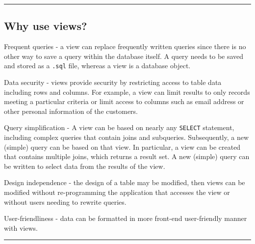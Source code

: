 \documentclass{article}
\begin{document}
\hspace{-0.5cm}\rule[-0.101in]{\textwidth}{0.0025in}
  
  




\subsection*{Why use views?}

\begin{outline}

   \1 Frequent queries - a view can replace frequently written queries since there is no other way to save a query within the database itself.  A query needs to be saved and stored as a \texttt{.sql} file, whereas a view is a database object.  
   
    \1   Data security -   views provide security by restricting access to table data including rows and columns.  For example, a view can limit results to only records meeting a particular criteria or limit access to columns such as email address or other personal information of the customers.
    
    \1 Query simplification - A view can be based on nearly any \texttt{SELECT} statement, including complex queries that contain joins and subqueries.  Subsequently, a new (simple) query can be based on that view.  In particular, a view can be created that contains multiple joins, which returns a result set.  A new (simple) query can be written to select data from the results of the view.  
    
    \1 Design independence - the design of a table may be modified, then views can be modified without re-programming the application that accesses the view or without users needing to rewrite queries.
    
    \1 User-friendliness - data can be formatted in more front-end user-friendly manner with views.  
 
\end{outline}





\hspace{-0.5cm}\rule[-0.101in]{\textwidth}{0.0025in}
  
  
  
  
\end{document}
